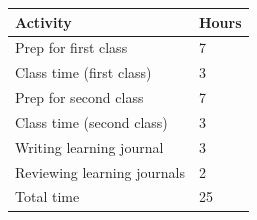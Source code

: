 \documentclass[]{book}
\theoremstyle{definition}
\theoremstyle{definition}
\theoremstyle{definition}
\theoremstyle{remark}
\begin{document}
\begin{longtable}[]{@{}ll@{}}
\toprule
\begin{minipage}[b]{0.42\columnwidth}\raggedright
Activity\strut
\end{minipage} & \begin{minipage}[b]{0.10\columnwidth}\raggedright
Hours\strut
\end{minipage}\tabularnewline
\midrule
\endhead
\begin{minipage}[t]{0.42\columnwidth}\raggedright
Prep for first class\strut
\end{minipage} & \begin{minipage}[t]{0.10\columnwidth}\raggedright
7\strut
\end{minipage}\tabularnewline
\begin{minipage}[t]{0.42\columnwidth}\raggedright
Class time (first class)\strut
\end{minipage} & \begin{minipage}[t]{0.10\columnwidth}\raggedright
3\strut
\end{minipage}\tabularnewline
\begin{minipage}[t]{0.42\columnwidth}\raggedright
Prep for second class\strut
\end{minipage} & \begin{minipage}[t]{0.10\columnwidth}\raggedright
7\strut
\end{minipage}\tabularnewline
\begin{minipage}[t]{0.42\columnwidth}\raggedright
Class time (second class)\strut
\end{minipage} & \begin{minipage}[t]{0.10\columnwidth}\raggedright
3\strut
\end{minipage}\tabularnewline
\begin{minipage}[t]{0.42\columnwidth}\raggedright
Writing learning journal\strut
\end{minipage} & \begin{minipage}[t]{0.10\columnwidth}\raggedright
3\strut
\end{minipage}\tabularnewline
\begin{minipage}[t]{0.42\columnwidth}\raggedright
Reviewing learning journals\strut
\end{minipage} & \begin{minipage}[t]{0.10\columnwidth}\raggedright
2\strut
\end{minipage}\tabularnewline
\begin{minipage}[t]{0.42\columnwidth}\raggedright
Total time\strut
\end{minipage} & \begin{minipage}[t]{0.10\columnwidth}\raggedright
25\strut
\end{minipage}\tabularnewline
\bottomrule
\end{longtable}
\end{document}
